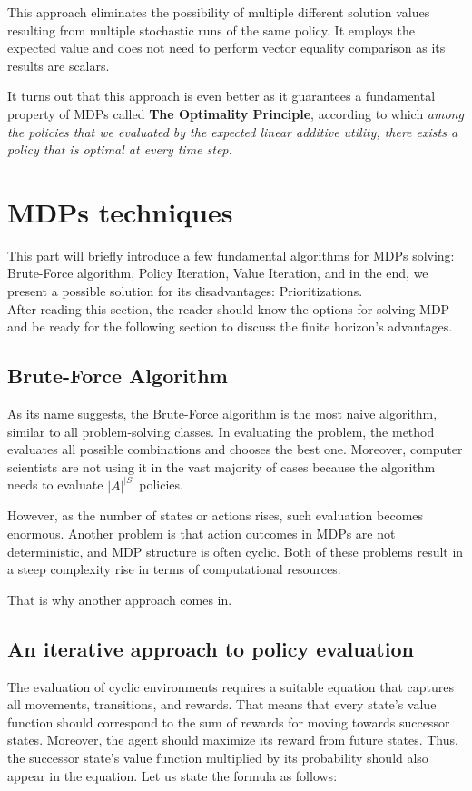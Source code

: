 This approach eliminates the possibility of multiple different solution values resulting from multiple stochastic runs of the same policy. It employs the expected value and does not need to perform vector equality comparison as its results are scalars.

It turns out that this approach is even better as it guarantees a fundamental property of MDPs called \textbf{The Optimality Principle}, according to which \textit{among the policies that we evaluated by the expected linear additive utility, there exists a policy that is optimal at every time step.}

\section{MDPs techniques}

This part will briefly introduce a few fundamental algorithms for MDPs solving: Brute-Force algorithm, Policy Iteration, Value Iteration, and in the end, we present a possible solution for its disadvantages: Prioritizations. \\
After reading this section, the reader should know the options for solving MDP and be ready for the following section to discuss the finite horizon's advantages.

\subsection{Brute-Force Algorithm}
As its name suggests, the Brute-Force algorithm is the most naive algorithm, similar to all problem-solving classes. In evaluating the problem, the method evaluates all possible combinations and chooses the best one.
Moreover, computer scientists are not using it in the vast majority of cases because the algorithm needs to evaluate $|A|^{|S|}$ policies.

However, as the number of states or actions rises, such evaluation becomes enormous. Another problem is that action outcomes in MDPs are not deterministic, and MDP structure is often cyclic. Both of these problems result in a steep complexity rise in terms of computational resources.

That is why another approach comes in.

\subsection{An iterative approach to policy evaluation}

The evaluation of cyclic environments requires a suitable equation that captures all movements, transitions, and rewards.
That means that every state's value function should correspond to the sum of rewards for moving towards successor states. Moreover, the agent should maximize its reward from future states. Thus, the successor state's value function multiplied by its probability should also appear in the equation. Let us state the formula as follows:

